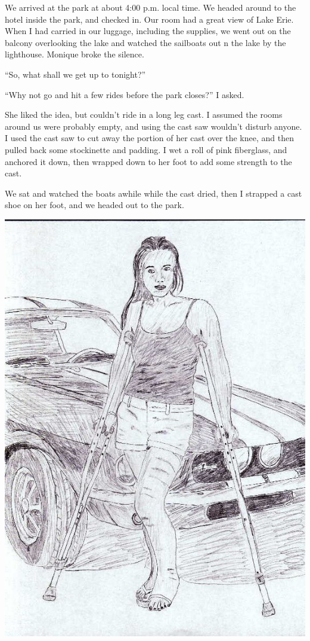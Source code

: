 We arrived at the park at about 4:00 p.m. local time. We headed around to the hotel inside
the park, and checked in. Our room had a great view of Lake Erie. When I had carried in our
luggage, including the supplies, we went out on the balcony overlooking the lake and watched the
sailboats out n the lake by the lighthouse. Monique broke the silence.

``So, what shall we get up to tonight?''

``Why not go and hit a few rides before the park closes?'' I asked.

She liked the idea, but couldn't ride in a long leg cast. I assumed the rooms around us
were probably empty, and using the cast saw wouldn't disturb anyone. I used the cast saw to cut
away the portion of her cast over the knee, and then pulled back some stockinette and padding. I
wet a roll of pink fiberglass, and anchored it down, then wrapped down to her foot to add some
strength to the cast.

We sat and watched the boats awhile while the cast dried, then I strapped a cast shoe on her
foot, and we headed out to the park.

\begin{center}
\includegraphics{images/kicks29.jpg}
\end{center}
